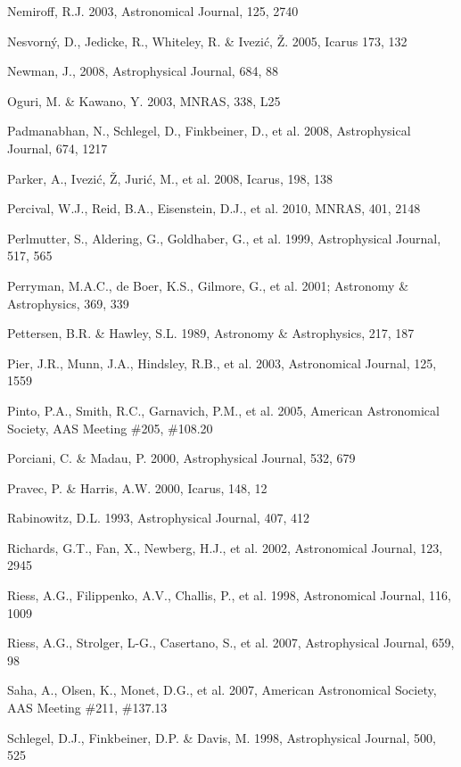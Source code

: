 \documentclass{emulateapj}
\begin{document}
\begin{thebibliography}{}
\bibitem[()]{} Nemiroff, R.J. 2003, Astronomical Journal, 125, 2740

\bibitem[()]{} Nesvorn\'{y}, D., Jedicke, R., Whiteley, R. \& Ivezi\'{c}, \v{Z}. 2005, Icarus 173, 132

\bibitem[()]{} Newman, J., 2008, Astrophysical Journal, 684, 88

\bibitem[()]{} Oguri, M. \& Kawano, Y. 2003, MNRAS, 338, L25 

\bibitem[()]{} Padmanabhan, N., Schlegel, D., Finkbeiner, D., et al. 2008, Astrophysical Journal, 674, 1217

\bibitem[()]{} Parker, A., Ivezi\'{c}, \v{Z}, Juri\'{c}, M., et al. 2008, Icarus, 198, 138

\bibitem[()]{} Percival, W.J., Reid, B.A., Eisenstein, D.J., et al. 2010, MNRAS, 401, 2148 

\bibitem[()]{} Perlmutter, S., Aldering, G., Goldhaber, G., et al. 1999, Astrophysical Journal, 517, 565

\bibitem[()]{} Perryman, M.A.C., de Boer, K.S., Gilmore, G., et al. 2001; Astronomy \& 
             Astrophysics, 369, 339

\bibitem[()]{} Pettersen, B.R. \& Hawley, S.L. 1989, Astronomy \& Astrophysics, 217, 187

\bibitem[()]{} Pier, J.R., Munn, J.A., Hindsley, R.B., et al. 2003, Astronomical Journal, 125, 1559

\bibitem[()]{} Pinto, P.A., Smith, R.C., Garnavich, P.M., et al. 2005, 
              American Astronomical Society, AAS Meeting \#205, \#108.20

\bibitem[()]{} Porciani, C. \& Madau, P. 2000, Astrophysical Journal, 532, 679

\bibitem[()]{} Pravec, P. \& Harris, A.W. 2000, Icarus, 148, 12

\bibitem[()]{} Rabinowitz, D.L. 1993,  Astrophysical Journal, 407, 412

\bibitem[()]{} Richards, G.T., Fan, X., Newberg, H.J., et al. 2002, Astronomical Journal, 123, 2945

\bibitem[()]{} Riess, A.G., Filippenko, A.V., Challis, P., et al. 1998, Astronomical Journal, 116, 1009

\bibitem[()]{} Riess, A.G., Strolger, L-G., Casertano, S., et al. 2007, Astrophysical Journal, 659, 98

\bibitem[()]{} Saha, A., Olsen, K., Monet, D.G., et al. 2007, American Astronomical Society, AAS 
             Meeting \#211, \#137.13

\bibitem[()]{} Schlegel, D.J., Finkbeiner, D.P. \& Davis, M. 1998, Astrophysical Journal, 500, 525


\end{thebibliography}
\end{document}
